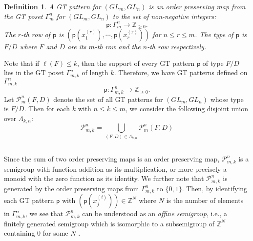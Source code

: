 \documentclass[11pt]{amsart}
\numberwithin{equation}{subsection}
\newtheorem{definition}[theorem]{Definition}
\begin{document}
\begin{definition}
A GT pattern for $({GL}_{{m}},{GL}_{{n}})$ is an order preserving map from
the GT poset $\Gamma _{m}^{n}$ for $({GL}_{m},{GL}_{n})$ to the set of
non-negative integers:
\begin{equation*}
\mathsf{p}:\Gamma _{m}^{n}\rightarrow \mathbb{Z}_{\geq 0}.
\end{equation*}
The $r$-th row of $\mathsf{p}$ is 
$(\mathsf{p}(x_{1}^{(r)}),\cdots ,\mathsf{p}(x_{r}^{(r)}))$ for $n\leq r\leq m$. 
The \textit{type} of $\mathsf{p}$ is $F/D$ where $F$ and $D$ are its $m$-th 
row and the $n$-th row respectively.
\end{definition}

Note that if $\ell (F)\leq k$, then the support of every GT pattern 
$\mathsf{p}$ of type $F/D$ lies in the GT poset $\Gamma _{m,k}^{n}$ of 
length $k$. Therefore, we have GT patterns defined on $\Gamma _{m,k}^{n}$
\begin{equation*}
\mathsf{p}:\Gamma _{m,k}^{n}\rightarrow \mathbb{Z}_{\geq 0}.
\end{equation*}
Let $\mathcal{P}_{m}^{n}(F,D)$ denote the set of all GT patterns for 
$({GL}_{{m}},{GL}_{{n}})$ whose type is $F/D$. Then for each $k$ with 
$n\leq k\leq m$, we consider the following disjoint union over $\Lambda _{k,n}$:
\begin{equation}\label{GT-Patterns}
\mathcal{P}_{m,k}^{n}=\bigcup_{(F,D)\in \Lambda _{k,n}}\mathcal{P}_{m}^{n}(F,D)
\end{equation}

\subsection{}\label{polycone}

Since the sum of two order preserving maps is an order preserving map, 
$\mathcal{P}_{m,k}^{n}$ is a semigroup with function addition as its
multiplication, or more precisely a monoid with the zero function as its
identity. 
We further note that $\mathcal{P}_{m,k}^{n}$ is generated by the order preserving
maps from $\Gamma _{m,k}^{n}$ to $\{0,1\}$. Then, by identifying each GT pattern 
$\mathsf{p}$ with $(\mathsf{p}(x_{j}^{(i)}))\in \mathbb{Z}^{N}$ where $N$ is
the number of elements in $\Gamma _{m,k}^{n}$, we see that $\mathcal{P}_{m,k}^{n}$ 
can be understood as an \textit{affine semigroup}, i.e., a finitely generated semigroup which is
isomorphic to a subsemigroup of $\mathbb{Z}^{N}$ containing $0$ for some $N$
\cite{BH93}.
\end{document}
